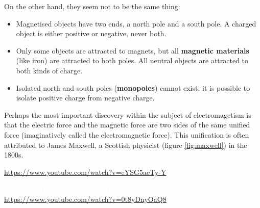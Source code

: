 \documentclass[a4paper]{amsbook}
\begin{document}
On the other hand, they seem not to be the same thing:
\begin{itemize}
  \item Magnetised objects have two ends, a north pole and a south pole. A charged object is either positive or negative, never both.
  \item Only some objects are attracted to magnets, but all \textbf{magnetic materials} (like iron) are attracted to both poles. All
        neutral objects are attracted to both kinds of charge.
  \item Isolated north and south poles (\textbf{monopoles}) cannot exist; it is possible to isolate positive charge from negative charge.
\end{itemize}

Perhaps the most important discovery within the subject of electromagetism is that the electric force and the magnetic force are
two sides of the same unified force (imaginatively called the electromagnetic force). This unification is often attributed to
James Maxwell, a Scottish physicist (figure \ref{fig:maxwell}) in the 1800s.

\begin{center}
\begin{tcolorbox}[width=0.8\textwidth,colback={red},title={\textbf{Go and watch...}},colbacktitle=yellow,coltitle=blue]
  \textcolor{white}{\url{https://www.youtube.com/watch?v=eYSG5aeTy-Y}}
\end{tcolorbox}
\end{center}

\begin{center}
\begin{tcolorbox}[width=0.8\textwidth,colback={red},title={\textbf{Go and watch...}},colbacktitle=yellow,coltitle=blue]
  \textcolor{white}{\textbf{Warning: this video may disturb some watchers.}\\
  \url{https://www.youtube.com/watch?v=0t8yDnyOaQ8}}
\end{tcolorbox}
\end{center}
\end{document}
